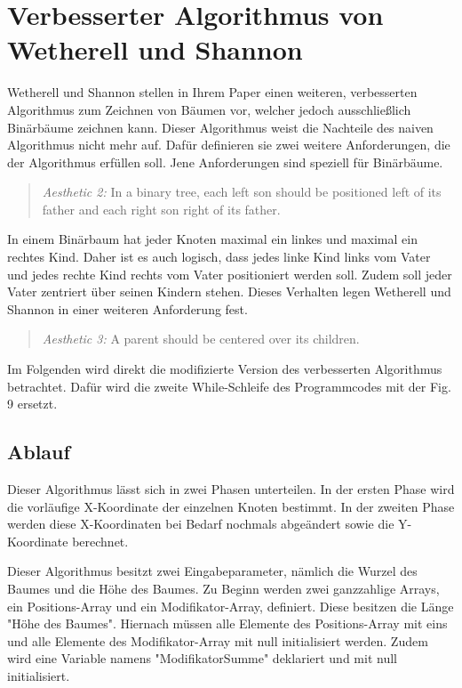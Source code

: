 
\section{Verbesserter Algorithmus von Wetherell und Shannon}
\label{chap:kapitel3_2}
Wetherell und Shannon stellen in Ihrem Paper einen weiteren, verbesserten Algorithmus zum Zeichnen von Bäumen vor, welcher jedoch
ausschließlich Binärbäume zeichnen kann. Dieser Algorithmus weist die Nachteile des naiven Algorithmus nicht mehr auf.
Dafür definieren sie zwei weitere Anforderungen, die der Algorithmus erfüllen soll. Jene Anforderungen sind speziell für Binärbäume.   

\begin{quotation}
	\textit{Aesthetic 2:} In a binary tree, each left son should be positioned
	left of its father and each right son right of its father\cite[]{q1}.
\end{quotation}

In einem Binärbaum hat jeder Knoten maximal ein linkes und maximal ein rechtes Kind. Daher ist es auch logisch, dass jedes linke Kind 
links vom Vater und jedes rechte Kind rechts vom Vater positioniert werden soll. Zudem soll jeder Vater zentriert über seinen Kindern
stehen. Dieses Verhalten legen Wetherell und Shannon in einer weiteren Anforderung fest.

\begin{quotation}
	\textit{Aesthetic 3:} A parent should be centered over its children\cite[]{q1}.
\end{quotation}

Im Folgenden wird direkt die modifizierte Version des verbesserten Algorithmus betrachtet. Dafür wird die zweite While-Schleife des Programmcodes
mit der Fig. 9 \cite[A modification of Algorithm 3]{q1} ersetzt.

\label{chap:kapitel3_2_Ablauf}
\subsection{Ablauf}

Dieser Algorithmus lässt sich in zwei Phasen unterteilen. In der ersten Phase wird die vorläufige X-Koordinate der einzelnen Knoten bestimmt.
In der zweiten Phase werden diese X-Koordinaten bei Bedarf nochmals abgeändert sowie die Y-Koordinate berechnet.

Dieser Algorithmus besitzt zwei Eingabeparameter, nämlich die Wurzel des Baumes und die Höhe des Baumes. Zu Beginn werden zwei
ganzzahlige Arrays, ein Positions-Array und ein Modifikator-Array, definiert. Diese besitzen die Länge "Höhe des Baumes".
Hiernach müssen alle Elemente des Positions-Array mit eins und alle Elemente des Modifikator-Array mit null initialisiert werden.
Zudem wird eine Variable namens "ModifikatorSumme" deklariert und mit null initialisiert.

